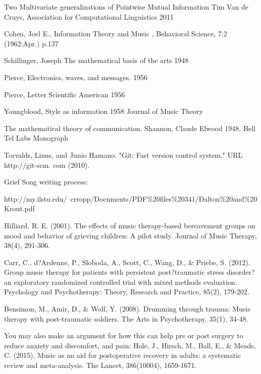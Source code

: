 \documentclass[final,authoryear,5p,times,twocolumn]{elsarticle}
\begin{document}
Two Multivariate generalizations of Pointwise Mutual Information Tim Van de Cruys, Association for Computational Linguistics 2011

Cohen, Joel E., Information Theory and Music , Behavioral Science, 7:2 (1962:Apr.) p.137

Schillinger, Joseph The mathematical basis of the arts 1948

Pierce, Electronics, waves, and messages. 1956

Pierce, Letter Scientific American 1956

Youngblood, Style as information 1958 Journal of Music Theory

The mathematical theory of communication. Shannon, Claude Elwood 1948. Bell Tel Labs Monograph

Torvalds, Linus, and Junio Hamano. "Git: Fast version control system." URL http://git-scm. com (2010).

Grief Song writing process:

http://my.ilstu.edu/~crropp/Documents/PDF\%20files\%20341/Dalton\%20and\%20Krout.pdf


Hilliard, R. E. (2001). The effects of music therapy-based bereavement groups on mood and behavior of grieving children: A pilot study. Journal of Music Therapy, 38(4), 291-306.

Carr, C., d?Ardenne, P., Sloboda, A., Scott, C., Wang, D., \& Priebe, S. (2012). Group music therapy for patients with persistent post?traumatic stress disorder?an exploratory randomized controlled trial with mixed methods evaluation. Psychology and Psychotherapy: Theory, Research and Practice, 85(2), 179-202.

Bensimon, M., Amir, D., \& Wolf, Y. (2008). Drumming through trauma: Music therapy with post-traumatic soldiers. The Arts in Psychotherapy, 35(1), 34-48.

You may also make an argument for how this can help pre or post surgery to reduce anxiety and discomfort, and pain:
Hole, J., Hirsch, M., Ball, E., \& Meads, C. (2015). Music as an aid for postoperative recovery in adults: a systematic review and meta-analysis. The Lancet, 386(10004), 1659-1671.




\end{document}
